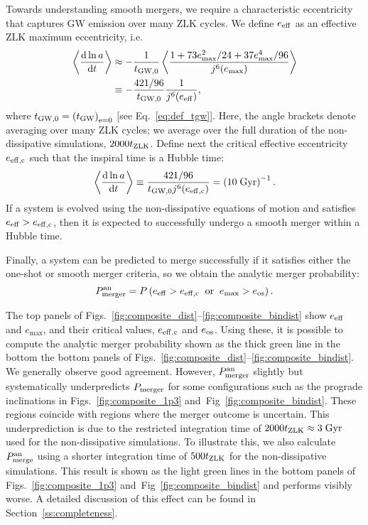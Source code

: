 \documentclass[
        fleqn,
        usenatbib,
    ]{mnras}
\newcommand*{\rd}[2]{\frac{\mathrm{d}#1}{\mathrm{d}#2}}
\newcommand*{\ev}[1]{\left\langle#1\right\rangle}
\newcommand*{\p}[1]{\left(#1\right)}
\begin{document}
Towards understanding smooth mergers, we require a characteristic eccentricity
that captures GW emission over many ZLK cycles. We define $e_{\rm eff}$ as an
effective ZLK maximum eccentricity, i.e.
\begin{align}
    \ev{\rd{\ln a}{t}} &\approx -\frac{1}{t_{\rm GW, 0}}
            \ev{\frac{1 + 73e_{\max}^2/24 + 37e_{\max}^4/96}
                {j^6(e_{\max})}}\nonumber\\
        &\equiv -\frac{421/96}{t_{\rm GW, 0}}\frac{1}{j^6(e_{\rm eff})},
        \label{eq:def_e_eff}
\end{align}
where $t_{\rm GW, 0} = \p{t_{\rm GW}}_{\rm e = 0}$ [see Eq.~\eqref{eq:def_tgw}].
Here, the angle brackets denote averaging over many ZLK cycles; we average over
the full duration of the non-dissipative simulations, $2000 t_{\rm ZLK}$. Define
next the critical effective eccentricity $e_{\rm eff, c}$ such that the inspiral
time is a Hubble time:
\begin{equation}
    \ev{\rd{\ln a}{t}} \equiv \frac{421/96}{t_{\rm GW, 0}j^6(e_{\rm eff, c})}
        = \p{10\;\mathrm{Gyr}}^{-1}. \label{eq:def_e_eff_c}
\end{equation}
If a system is evolved using the non-dissipative equations of motion and
satisfies $e_{\rm eff} > e_{\rm eff, c}$, then it is expected to successfully
undergo a smooth merger within a Hubble time.

Finally, a system can be predicted to merge successfully if it satisfies either
the one-shot or smooth merger criteria, so we obtain the analytic merger
probability:
\begin{equation}
    P_{\rm merger}^{\rm an} = P\p{e_{\rm eff} > e_{\rm eff, c} \;\;\text{or}\;\;
        e_{\max} > e_{\rm os}}.\label{eq:def_pmerge_sa}
\end{equation}

The top panels of Figs.~\ref{fig:composite_dist}--\ref{fig:composite_bindist}
show $e_{\rm eff}$ and $e_{\max}$, and their critical values, $e_{\rm eff, c}$
and $e_{\rm os}$. Using these, it is possible to compute the analytic merger
probability shown as the thick green line in the bottom the bottom panels of
Figs.~\ref{fig:composite_dist}--\ref{fig:composite_bindist}. We generally
observe good agreement. However, $P_{\rm merger}^{\rm an}$ slightly but
systematically underpredicts $P_{\rm merger}$ for some configurations such as
the prograde inclinations in Figs.~\ref{fig:composite_1p3}
and~Fig~\ref{fig:composite_bindist}. These regions coincide with regions where the
merger outcome is uncertain. This underprediction is due to the restricted
integration time of $2000 t_{\rm ZLK} \approx 3\;\mathrm{Gyr}$ used for the
non-dissipative simulations. To illustrate this, we also calculate
$P_{\rm merge}^{\rm an}$ using a shorter integration time of $500 t_{\rm
ZLK}$ for the non-dissipative simulations. This result is shown as the light
green lines in the bottom panels of Figs.~\ref{fig:composite_1p3}
and~Fig~\ref{fig:composite_bindist} and performs visibly worse. A detailed
discussion of this effect can be found in
Section~\ref{ss:completeness}.
\end{document}
